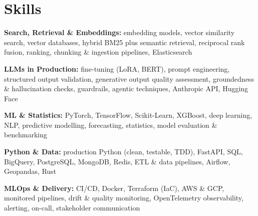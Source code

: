 \documentclass[10pt,a4paper]{article}
\begin{document}
\section{Skills}
\begin{tight}
  \item[\textcolor{accent}{\small$\bullet$}] \textbf{Search, Retrieval \& Embeddings:} embedding models, vector similarity search, vector databases, hybrid BM25 plus semantic retrieval, reciprocal rank fusion, ranking, chunking \& ingestion pipelines, Elasticsearch
  \item[\textcolor{accent}{\small$\bullet$}] \textbf{LLMs in Production:} fine-tuning (LoRA, BERT), prompt engineering, structured output validation, generative output quality assessment, groundedness \& hallucination checks, guardrails, agentic techniques, Anthropic API, Hugging Face
  \item[\textcolor{accent}{\small$\bullet$}] \textbf{ML \& Statistics:} PyTorch, TensorFlow, Scikit-Learn, XGBoost, deep learning, NLP, predictive modelling, forecasting, statistics, model evaluation \& benchmarking
  \item[\textcolor{accent}{\small$\bullet$}] \textbf{Python \& Data:} production Python (clean, testable, TDD), FastAPI, SQL, BigQuery, PostgreSQL, MongoDB, Redis, ETL \& data pipelines, Airflow, Geopandas, Rust
  \item[\textcolor{accent}{\small$\bullet$}] \textbf{MLOps \& Delivery:} CI/CD, Docker, Terraform (IaC), AWS \& GCP, monitored pipelines, drift \& quality monitoring, OpenTelemetry observability, alerting, on-call, stakeholder communication
\end{tight}

\end{document}
